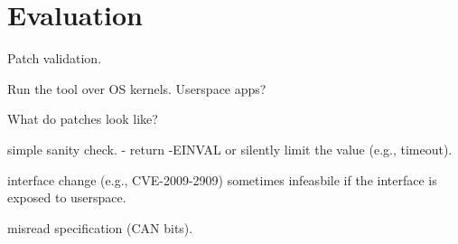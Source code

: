 \section{Evaluation}
\label{s:eval}

Patch validation.

Run the tool over OS kernels.  Userspace apps?

What do patches look like?

simple sanity check.
- return -EINVAL or silently limit the value (e.g., timeout).

interface change (e.g., CVE-2009-2909)
sometimes infeasbile if the interface is exposed to userspace.

misread specification (CAN bits).
